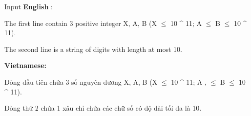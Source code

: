 Input
\textbf{    English   }   :  

   The first line contain 3 positive integer X, A, B (X  $\le$  10 ^ 11; A  $\le$  B  $\le$  10 ^ 11).  

   The second line is a string of digits with length at most 10.  

\textbf{    Vietnamese:   }

   Dòng đầu tiên chứa 3 số nguyên dương X, A, B (X  $\le$  10 ^ 11; A , $\le$  B  $\le$  10 ^ 11).  

   Dòng thứ 2 chứa 1 xâu chỉ chứa các chữ số có độ dài tối đa là 10.